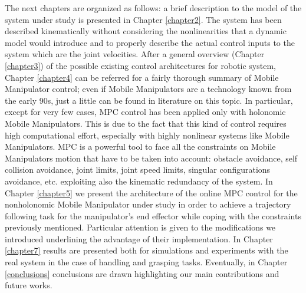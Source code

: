 The next chapters are organized as follows: a brief description to the model of the system under study is presented in Chapter \ref{chapter2}. The system has been described kinematically without considering the nonlinearities that a dynamic model would introduce and to properly describe the actual control inputs to the system which are the joint velocities. After a general overview (Chapter \ref{chapter3}) of the possible existing control architectures for robotic system, Chapter \ref{chapter4} can be referred for a fairly thorough summary of Mobile Manipulator control; even if Mobile Manipulators are a technology known from the early 90s, just a little can be found in literature on this topic. In particular, except for very few cases, MPC control has been applied only with holonomic Mobile Manipulators. This is due to the fact that this kind of control requires high computational effort, especially with highly nonlinear systems like Mobile Manipulators. MPC is a powerful tool to face all the constraints on Mobile Manipulators motion that have to be taken into account: obstacle avoidance, self collision avoidance, joint limits, joint speed limits, singular configurations avoidance, etc. exploiting also the kinematic redundancy of the system.
In Chapter \ref{chapter5} we present the architecture of the online MPC control for the nonholonomic Mobile Manipulator under study in order to achieve a trajectory following task for the manipulator's end effector while coping with the constraints previously mentioned. Particular attention is given to the modifications we introduced underlining the advantage of their implementation. In Chapter \ref{chapter7} results are presented both for simulations and experiments with the real system in the case of handling and grasping tasks. Eventually, in Chapter \ref{conclusions} conclusions are drawn highlighting our main contributions and future works.